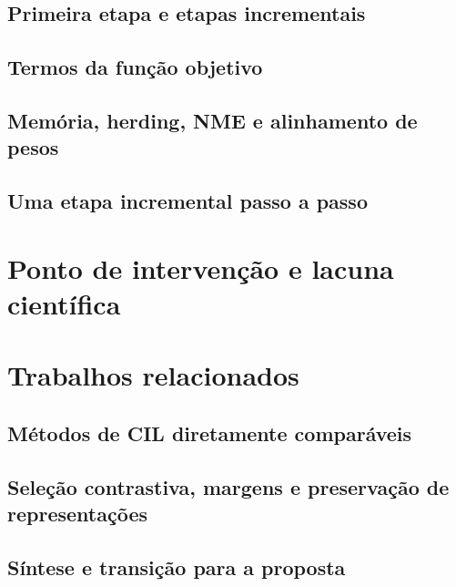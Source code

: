 \subsection{Primeira etapa e etapas incrementais}

\subsection{Termos da função objetivo}

\subsection{Memória, herding, NME e alinhamento de pesos}

\subsection{Uma etapa incremental passo a passo}

\section{Ponto de intervenção e lacuna científica}

\section{Trabalhos relacionados}

\subsection{Métodos de CIL diretamente comparáveis}

\subsection{Seleção contrastiva, margens e preservação de representações}

\subsection{Síntese e transição para a proposta}

